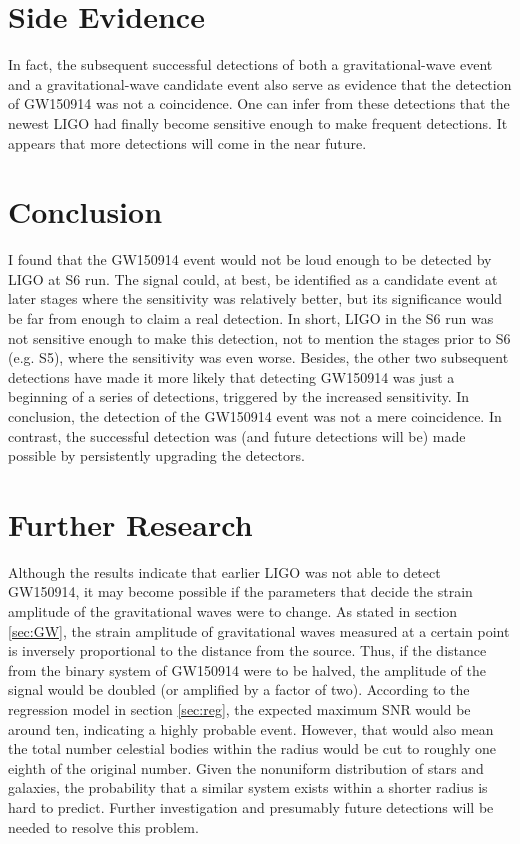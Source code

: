 \documentclass[aps,prd,preprint]{revtex4}
\begin{document}
\section{Side Evidence}
 In fact, the subsequent successful detections of both a gravitational-wave event \cite{GW2} and a gravitational-wave candidate event \cite{Candidate,Observation1} also serve as evidence that the detection of GW150914 was not a coincidence. One can infer from these detections that the newest LIGO had finally become sensitive enough to make frequent detections. It appears that more detections will come in the near future.
 
 
\section{Conclusion}
I found that the GW150914 event would not be loud enough to be detected by LIGO at S6 run. The signal could, at best, be identified as a candidate event at later stages where the sensitivity was relatively better, but its significance would be far from enough to claim a real detection. In short, LIGO in the S6 run was not sensitive enough to make this detection, not to mention the stages prior to S6 (e.g. S5), where the sensitivity was even worse. Besides, the other two subsequent detections have made it more likely that detecting GW150914 was just a beginning of a series of detections, triggered by the increased sensitivity. In conclusion, the detection of the GW150914 event was not a mere coincidence. In contrast, the successful detection was (and future detections will be) made possible by persistently upgrading the detectors.


\section{Further Research}
Although the results indicate that earlier LIGO was not able to detect GW150914, it may become possible if the parameters that decide the strain amplitude of the gravitational waves were to change. As stated in section \ref{sec:GW}, the strain amplitude of gravitational waves measured at a certain point is inversely proportional to the distance from the source. Thus, if the distance from the binary system of GW150914 were to be halved, the amplitude of the signal would be doubled (or amplified by a factor of two). According to the regression model in section \ref{sec:reg}, the expected maximum SNR would be around ten, indicating a highly probable event. However, that would also mean the total number celestial bodies within the radius would be cut to roughly one eighth of the original number. Given the nonuniform distribution of stars and galaxies, the probability that a similar system exists within a shorter radius is hard to predict. Further investigation and presumably future detections will be needed to resolve this problem.
\end{document}
